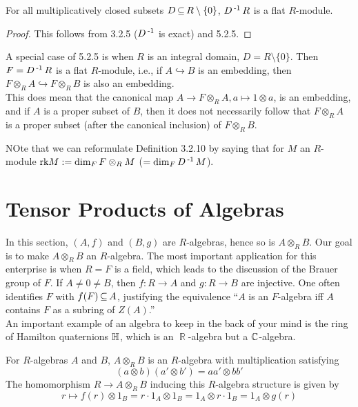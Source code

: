 \documentclass[11pt]{book}
\theoremstyle{definition}   \newtheorem{defn}[counter]{Definition} %
\newcommand{\bs}{\setminus}   \newcommand{\A}{\mathcal{A}}   \newcommand{\sy}{\textnormal{Syl}}   \newcommand{\size}[1]{\left| #1 \right|}
\DeclareMathOperator{\R}{\mathbb{R}}   \DeclareMathOperator{\N}{\mathbb{N}}   \DeclareMathOperator{\z}{\mathbb{Z}}   \DeclareMathOperator{\Q}{\mathbb{Q}}
\DeclareMathOperator{\ra}{\rightarrow}   \DeclareMathOperator{\Poly}{\mathbf{P}}   \DeclareMathOperator{\spn}{\textnormal{span}}   \DeclareMathOperator{\aut}{\textnormal{Aut}}
\newcommand{\vs}{\vspace{8pt}}
\numberwithin{counter}{chapter}
\begin{document}
\vs

\begin{corollary}
For all multiplicatively closed subsets $D \sub R \bs \{0\}$, $D\operatorname{^{-1}} R$ is a flat $R$-module.
\end{corollary}

\begin{proof}
This follows from 3.2.5 ($D\operatorname{^{-1}}$ is exact) and 5.2.5. 
\end{proof}

\vs

A special case of 5.2.5 is when $R$ is an integral domain, $D = R \bs \{0\}$. Then $F = D\operatorname{^{-1}} R$ is a flat $R$-module, i.e., if $A \hookrightarrow B$ is an embedding, then $F \otimes_R A \hookrightarrow F \otimes_R B$ is also an embedding. \\

\noindent {} This does  mean that the canonical map $A \ra F \otimes_R A, a \mapsto 1 \otimes a$, is an embedding, and if $A$ is a proper subset of $B$, then it does not necessarily follow that $F \otimes_R A$ is a proper subset (after the canonical inclusion) of $F \otimes_R B$. 

\vs

NOte that we can reformulate Definition 3.2.10 by saying that for $M$ an $R$-module $\textnormal{rk} M := \dim_F F \otimes_R M$ ($= \dim_F D\operatorname{^{-1}} M$). 

\section*{Tensor Products of Algebras}

In this section, $(A,f)$ and $(B,g)$ are $R$-algebras, hence so is $A \otimes_R B$. Our goal is to make $A \otimes_R B$ an $R$-algebra. The most important application for this enterprise is when $R = F$ is a field, which leads to the discussion of the Brauer group of $F$. If $A \ne 0 \ne B$, then $f : R \ra A$ and $g : R \ra B$ are injective. One often identifies $F$ with $f(F) \operatorname{\subseteq} A$, justifying the equivalence ``$A$ is an $F$-algebra iff $A$ contains $F$ as a subring of $Z(A)$.'' \\

An important example of an algebra to keep in the back of your mind is the ring of Hamilton quaternions $\mathbb{H}$, which is an $\R$-algebra but  a $\operatorname{\mathbb{C}}$-algebra. 

\vs

\begin{lemma}
For $R$-algebras $A$ and $B$, $A \otimes_R B$ is an $R$-algebra with multiplication satisfying
	\[(a \otimes b) (a' \otimes b') = aa' \otimes bb' \]
The homomorphism $R \ra A \otimes_R B$ inducing this $R$-algebra structure is given by 
	\[r \mapsto f(r) \otimes 1_B = r \cdot 1_A \otimes 1_B = 1_A \otimes r \cdot 1_B = 1_A \otimes g(r) \]
\end{lemma}
\end{document}
